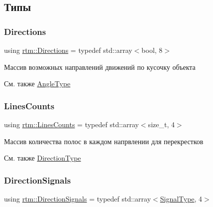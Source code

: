 \subsection{Типы}
\mbox{\label{namespacertm_a4776fbfe59834ff1a16838ad6735b69a}} 
\subsubsection{\texorpdfstring{Directions}{Directions}}
{\footnotesize\ttfamily using \hyperlink{namespacertm_a4776fbfe59834ff1a16838ad6735b69a}{rtm\+::\+Directions} = typedef std\+::array$<$bool, 8$>$}



Массив возможных направлений движений по кусочку объекта 

\begin{DoxySeeAlso}{См. также}
\hyperlink{namespacertm_a69dc82b16a0148c10962caa83d930f89}{Angle\+Type} 
\end{DoxySeeAlso}
\mbox{\label{namespacertm_a14457f3088a92b86a96686b72d3e4eea}} 
\subsubsection{\texorpdfstring{Lines\+Counts}{LinesCounts}}
{\footnotesize\ttfamily using \hyperlink{namespacertm_a14457f3088a92b86a96686b72d3e4eea}{rtm\+::\+Lines\+Counts} = typedef std\+::array$<$size\+\_\+t, 4$>$}



Массив количества полос в каждом напрвлении для перекрестков 

\begin{DoxySeeAlso}{См. также}
\hyperlink{namespacertm_a57b216f3aeb45041f3461bab08bc3aeb}{Direction\+Type} 
\end{DoxySeeAlso}
\mbox{\label{namespacertm_a681634e130c2137fe63a658b0e0a5e46}} 
\subsubsection{\texorpdfstring{Direction\+Signals}{DirectionSignals}}
{\footnotesize\ttfamily using \hyperlink{namespacertm_a681634e130c2137fe63a658b0e0a5e46}{rtm\+::\+Direction\+Signals} = typedef std\+::array$<$\hyperlink{namespacertm_aadb7300c15d57429546fb0b7f8ee0ee6}{Signal\+Type}, 4$>$}



